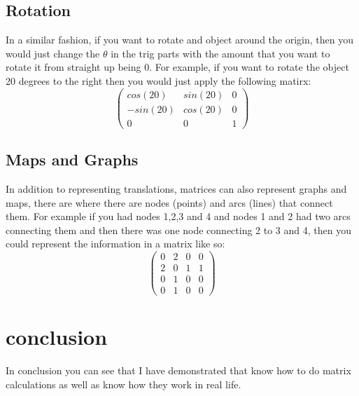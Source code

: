 \documentclass{article}
\begin{document}
\subsection{Rotation}
In a similar fashion, if you want to rotate and object around the origin, then you would just change the $\theta$ in the trig parts with the amount that you want to rotate it from straight up being 0. For example, if you want to rotate the object 20 degrees to the right then you would just apply the following matirx:
\[
	\begin{pmatrix}
		cos(20) & sin(20) & 0\\
		-sin(20) & cos(20) & 0\\
		0 & 0 & 1
	\end{pmatrix}
\]

\subsection{Maps and Graphs}
In addition to representing translations, matrices can also represent graphs and maps, there are where there are nodes (points) and arcs (lines) that connect them. For example if you had nodes 1,2,3 and 4 and nodes 1 and 2 had two arcs connecting them and then there was one node connecting 2 to 3 and 4, then you could represent the information in a matrix like so:
\[
	\begin{pmatrix}
		0 &	2 & 0 & 0\\
		2 &	0 & 1 & 1\\
		0 &	1 & 0 & 0\\
		0 &	1 & 0 & 0
	\end{pmatrix}
\]
\section{conclusion}
In conclusion you can see that I have demonstrated that know how to do matrix calculations as well as know how they work in real life. 
\end{document}
